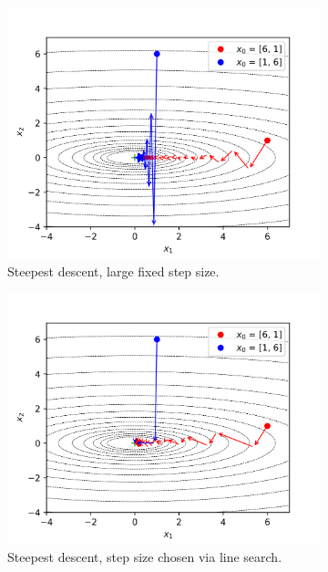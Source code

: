 \begin{figure}[!t]
\begin{subfigure}[b]{0.46\linewidth}
        \includegraphics[width=\textwidth]{figs/large_step.png}
        \caption{Steepest descent, large fixed step size.}
        \label{fig:graddesc_large}
    \end{subfigure}
    \begin{subfigure}[b]{0.46\linewidth}
        \centering
        \includegraphics[width=\textwidth]{figs/linesearch.png}
        \caption{Steepest descent, step size chosen via line search.}
        \label{fig:graddesc_line}
    \end{subfigure}%
    \begin{subfigure}[b]{0.46\linewidth}

\end{subfigure}
\end{figure}
